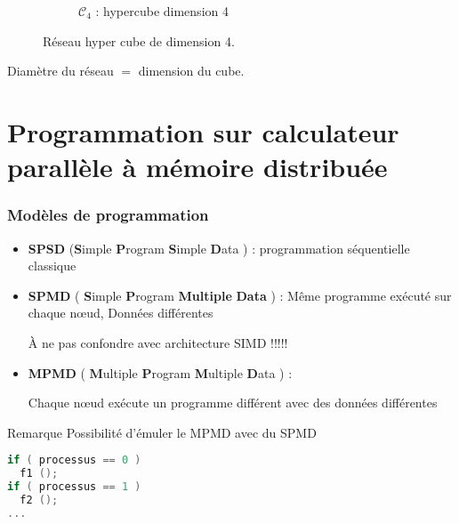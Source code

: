 \documentclass[handout]{beamer}
\begin{document}
\begin{frame}[fragile]
\begin{figure}[h]
\begin{subfigure}[c]{0.46\textwidth}
\caption{$\mathcal{C}_{4}$ : hypercube dimension 4}\label{fig:HypCub4}
\end{subfigure}
\caption{Réseau hyper cube de dimension 4.}
\end{figure}

Diamètre du réseau $=$ dimension du cube.

\end{frame}

\section{Programmation sur calculateur parallèle à mémoire distribuée}

\begin{frame}[fragile]
\frametitle{Modèles de programmation}

\begin{itemize}
\item \textbf{SPSD} ({\bf S}imple {\bf P}rogram {\bf S}imple {\bf D}ata ) :
programmation séquentielle classique

\item \textbf{SPMD} ( {\bf S}imple {\bf P}rogram {\bf Multiple} {\bf Data} ) :
Même programme exécuté sur chaque n{\oe}ud, Données différentes

\alert{\`A ne pas confondre avec architecture SIMD !!!!!}

\item \textbf{MPMD} ( {\bf M}ultiple {\bf P}rogram {\bf M}ultiple {\bf D}ata ) :

Chaque n{\oe}ud exécute un programme différent avec des données différentes
\end{itemize}

\begin{block}{Remarque}
Possibilité d'émuler le MPMD avec du SPMD

\begin{lstlisting}[language=C++]
if ( processus == 0 )
  f1 ();
if ( processus == 1 )
  f2 ();
...
\end{lstlisting} 
\end{block}
\end{frame}
\end{document}
